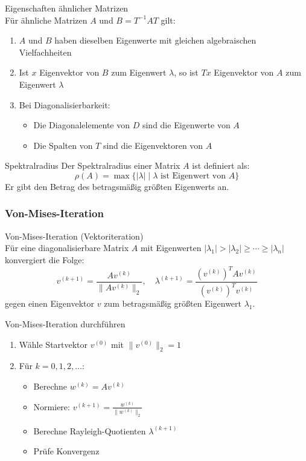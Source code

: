 \begin{theorem}{Eigenschaften ähnlicher Matrizen}\\
Für ähnliche Matrizen $A$ und $B = T^{-1}AT$ gilt:
\begin{enumerate}
    \item $A$ und $B$ haben dieselben Eigenwerte mit gleichen algebraischen Vielfachheiten
    \item Ist $x$ Eigenvektor von $B$ zum Eigenwert $\lambda$, so ist $Tx$ Eigenvektor von $A$ zum Eigenwert $\lambda$
    \item Bei Diagonalisierbarkeit:
    \begin{itemize}
        \item Die Diagonalelemente von $D$ sind die Eigenwerte von $A$
        \item Die Spalten von $T$ sind die Eigenvektoren von $A$
    \end{itemize}
\end{enumerate}
\end{theorem}

\begin{definition}{Spektralradius}
Der Spektralradius einer Matrix $A$ ist definiert als:
$$\rho(A) = \max\{|\lambda| \mid \lambda \text{ ist Eigenwert von } A\}$$
Er gibt den Betrag des betragsmäßig größten Eigenwerts an.
\end{definition}

\subsubsection{Von-Mises-Iteration}

\begin{concept}{Von-Mises-Iteration (Vektoriteration)}\\
Für eine diagonalisierbare Matrix $A$ mit Eigenwerten $|\lambda_1| > |\lambda_2| \geq \cdots \geq |\lambda_n|$ konvergiert die Folge:
$$v^{(k+1)} = \frac{Av^{(k)}}{\|Av^{(k)}\|_2}, \quad
\lambda^{(k+1)} = \frac{(v^{(k)})^TAv^{(k)}}{(v^{(k)})^Tv^{(k)}}$$
gegen einen Eigenvektor $v$ zum betragsmäßig größten Eigenwert $\lambda_1$.
\end{concept}

\begin{KR}{Von-Mises-Iteration durchführen}
\begin{enumerate}
    \item Wähle Startvektor $v^{(0)}$ mit $\|v^{(0)}\|_2 = 1$
    \item Für $k = 0,1,2,\ldots$:
    \begin{itemize}
        \item Berechne $w^{(k)} = Av^{(k)}$
        \item Normiere: $v^{(k+1)} = \frac{w^{(k)}}{\|w^{(k)}\|_2}$
        \item Berechne Rayleigh-Quotienten $\lambda^{(k+1)}$
        \item Prüfe Konvergenz
    \end{itemize}
\end{enumerate}
\end{KR}

